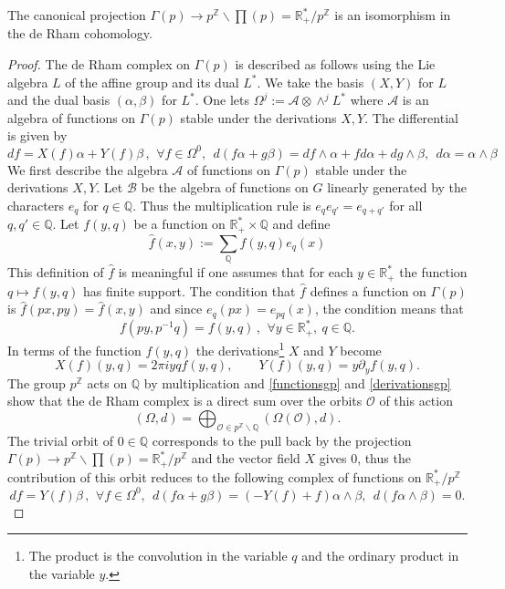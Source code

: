 \documentclass[graybox, envcountsect%
]{svmult}
\def\Q{{\mathbb Q}}
\def\R{{\mathbb R}}
\def\Z{{\mathbb Z}}
\def\cA{{\mathcal A}}
\def\cB{{\mathcal B}}
\def\cO{{\mathcal O}}
\def\qqq{\,,\,~\forall}
\begin{document}
\begin{proposition}\label{derham}
	The canonical projection $\Gamma(p)\to p^\Z\backslash \prod(p)= \R_+^*/p^\Z$ is an isomorphism in the de Rham cohomology.
\end{proposition}
\begin{proof} The de Rham complex on $\Gamma(p)$ is described as follows using the Lie algebra $L$ of the affine group and its dual $L^*$. We take the basis $(X,Y)$ for $L$ and the dual basis $(\alpha,\beta)$ for $L^*$. One lets $\Omega^j:=\cA\otimes \wedge^j L^*$ where $\cA$ is an algebra of functions on $\Gamma(p)$ stable under the derivations $X,Y$. The differential is given by 
$$
df=X(f)\alpha+Y(f)\beta \qqq f\in \Omega^0, \ \ d(f\alpha+g\beta)= df\wedge \alpha+fd\alpha+dg\wedge \beta, \ \ d\alpha=\alpha\wedge \beta
$$
We first describe the algebra $\cA$ of functions on $\Gamma(p)$ stable under the derivations $X,Y$. Let $\cB$ be the algebra of functions on $G$ linearly generated by the characters $e_q$ for $q\in \Q$. Thus the multiplication rule is $e_qe_{q'}=e_{q+q'}$ for all $q,q'\in \Q$. Let $f(y,q)$ be a function on $\R_+^*\times \Q$ and define
$$
\hat f(x,y):=\sum_\Q f(y,q)e_q(x)
$$
This definition of  $\hat f$ is meaningful if one assumes that for each $y\in \R_+^*$ the function $q\mapsto f(y,q)$ has finite support. The condition that $\hat f$ defines a function on $\Gamma(p)$ is  $\hat f(px,py)=\hat f(x,y)$ and since $e_q(px)=e_{pq}(x)$, the condition means that 
\begin{equation}\label{functionsgp}
f(py,p^{-1}q)=f(y,q)\qqq y \in \R_+^*, \ q\in \Q.
\end{equation}
In terms of the function $f(y,q)$ the derivations\footnote{The product is the convolution in the variable $q$ and the ordinary product in the variable $y$.} $X$ and $Y$ become
\begin{equation}\label{derivationsgp}
X(f)(y,q)=2\pi i yq f(y,q), \qquad Y(f)(y,q)=y\partial_yf(y,q).
\end{equation} 
The group $p^\Z$ acts on $\Q$ by multiplication and \eqref{functionsgp} and \eqref{derivationsgp} show that the de Rham complex is a direct sum over the orbits $\cO$ of this action
$$
(\Omega,d)=\bigoplus_{\cO \in p^\Z\backslash\Q}(\Omega(\cO),d).
$$
The trivial orbit of $0\in \Q$ corresponds to the pull back by the projection $\Gamma(p)\to p^\Z\backslash \prod(p)= \R_+^*/p^\Z$ and the vector field $X$ gives $0$, thus the contribution of this orbit reduces to the following complex of functions on $\R_+^*/p^\Z$
$$
df=Y(f)\beta \qqq f\in \Omega^0, \ \ d(f\alpha+g\beta)= (-Y(f)+f) \alpha\wedge \beta, \ \ d(f\alpha\wedge \beta)=0. 
$$
\end{proof}
\end{document}
